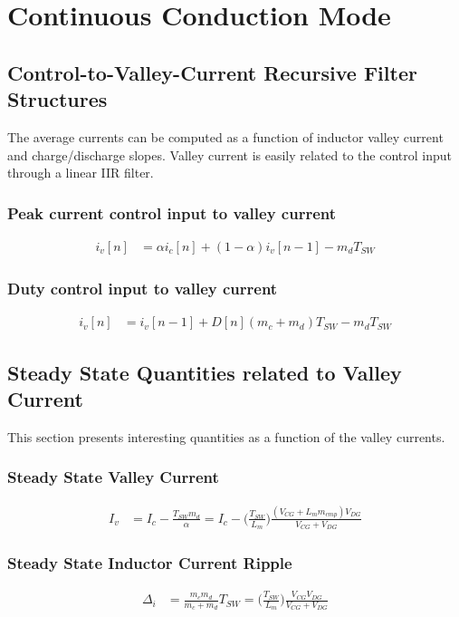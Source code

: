 \documentclass{scrartcl}
\begin{document}
	\section{Continuous Conduction Mode}
		\subsection{Control-to-Valley-Current Recursive Filter Structures}
		The average currents can be computed as a function of inductor valley current and charge/discharge slopes.  Valley current is easily related to the control input through a linear IIR filter.
		\subsubsection{Peak current control input to valley current}
			\begin{align}
			i_v[n] &=  \alpha i_c[n] + ( 1 - \alpha ) i_v [n-1] - m_dT_{SW}    \label{ivn_cpm}
			\end{align}
		
		\subsubsection{Duty control input to valley current}
			\begin{align}
			i_v[n] &= i_v[n-1] +  D[n](m_c+m_d)T_{SW} - m_dT_{SW}  \label{ivn_dc}	
			\end{align}		
		

	\subsection{Steady State Quantities related to Valley Current}
	This section presents interesting quantities as a function of the valley currents.
	
		\subsubsection{Steady State Valley Current}
			\begin{align}
			I_{v} &=  I_{c} - \frac{T_{SW}m_d} {\alpha} =
			I_c - \bigg(\frac{T_{SW}} {L_m}\bigg) \frac{(V_{CG}+L_m m_{cmp})V_{DG} }{V_{CG}+V_{DG}} \label{ic_to_iv}
			\end{align}
			
		\subsubsection{Steady State Inductor Current Ripple}
			\begin{align}
			\Delta_i &=  \frac{m_c m_d}{m_c + m_d} T_{SW} = \bigg(\frac{T_{SW}} {L_m}\bigg)\frac{V_{CG} V_{DG}}{V_{CG} + V_{DG}}
			\end{align}	
	
\end{document}
